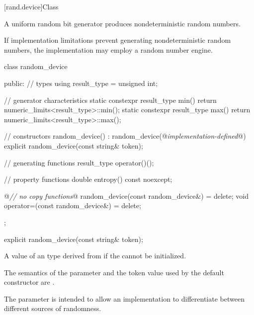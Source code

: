 [rand.device]{Class }%
%

\pnum
A 
uniform random bit generator
produces nondeterministic random numbers.

\pnum
If implementation limitations
prevent generating nondeterministic random numbers,
the implementation may employ a random number engine.

%
%
\begin{codeblock}
class random_device {
public:
  // types
  using result_type = unsigned int;

  // generator characteristics
  static constexpr result_type min() { return numeric_limits<result_type>::min(); }
  static constexpr result_type max() { return numeric_limits<result_type>::max(); }

  // constructors
  random_device() : random_device(@\textit{implementation-defined}@) {}
  explicit random_device(const string& token);

  // generating functions
  result_type operator()();

  // property functions
  double entropy() const noexcept;

  @\textit{// no copy functions}@
  random_device(const random_device&) = delete;
  void operator=(const random_device&) = delete;
};
\end{codeblock}


%
\begin{itemdecl}
explicit random_device(const string& token);
\end{itemdecl}

\begin{itemdescr}
\pnum
\throws
A value of an  type
 derived from 
 if the  cannot be initialized.

\pnum
\remarks
 The semantics of the  parameter
 and the token value used by the default constructor are
 .
\begin{footnote}
The parameter is intended
   to allow an implementation to differentiate
   between different sources of randomness.
\end{footnote}
\end{itemdescr}

